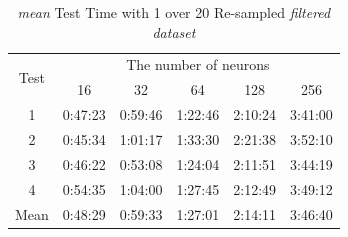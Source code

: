 \documentclass[draft,dvipsnames]{drexel-thesis}
\begin{document}
\begin{thesis}
\begin{table}[!t]
\centering
\caption{{\em mean} Test Time with 1 over 20 Re-sampled {\em filtered dataset}}
\label{tbl:mean_1_20_time}
\begin{tabular}{|c|c|c|c|c|c|}
\hline
\multirow{2}{*}{Test}      & \multicolumn{5}{c|}{The number of neurons}                                                                                                               \\ \cline{2-6}
                           & 16                           & 32                           & 64                           & 128                          & 256                          \\ \hline
1                          & 0:47:23                      & 0:59:46                      & 1:22:46                      & 2:10:24                      & 3:41:00                      \\ \hline
2                          & 0:45:34                      & 1:01:17                      & 1:33:30                      & 2:21:38                      & 3:52:10                      \\ \hline
3                          & 0:46:22                      & 0:53:08                      & 1:24:04                      & 2:11:51                      & 3:44:19                      \\ \hline
4                          & 0:54:35                      & 1:04:00                      & 1:27:45                      & 2:12:49                      & 3:49:12                      \\ \hline
\multicolumn{1}{|l|}{Mean} & \multicolumn{1}{l|}{0:48:29} & \multicolumn{1}{l|}{0:59:33} & \multicolumn{1}{l|}{1:27:01} & \multicolumn{1}{l|}{2:14:11} & \multicolumn{1}{l|}{3:46:40} \\ \hline
\end{tabular}
\end{table}


\end{thesis}
\end{document}
